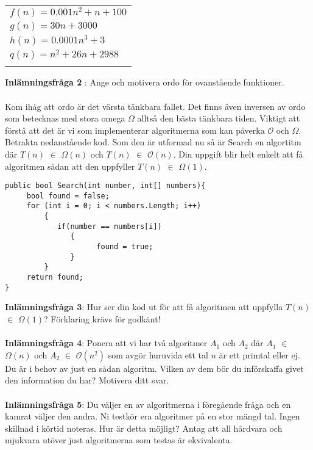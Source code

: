 \documentclass{article}
\begin{document}
 \begin{center}
 \begin{tabular}{ l }
	$f(n) = 0.001n^2 + n + 100$ \\
	$g(n) = 30n + 3000$\\
	$h(n) = 0.0001n^3 + 3$\\
	$q(n) = n^2 + 26n + 2988$\\\\
	\end{tabular}
 \end{center} 
 \textbf{Inlämningsfråga 2} : Ange och motivera ordo för ovanstående funktioner. \\\\
  Kom ihåg att ordo är det värsta tänkbara fallet. Det finns även inversen av ordo som betecknas med stora omega $\Omega$ alltså den bästa tänkbara tiden. Viktigt att förstå att det är vi som implementerar algoritmerna som kan påverka $\mathcal{O}$ och $\Omega$. Betrakta nedanstående kod. Som den är utformad nu så är Search en algortitm där  $T(n)$ $\in$ $\Omega  (n)$ och $T(n)$ $\in$ $\mathcal{O}(n)$. Din uppgift blir helt enkelt att få algoritmen sådan att den uppfyller  $T(n)$ $\in$ $\Omega(1)$.
  \pagebreak
  \begin{lstlisting}
public bool Search(int number, int[] numbers){
     bool found = false;
     for (int i = 0; i < numbers.Length; i++)
         { 
            if(number == numbers[i])
               {
                     found = true;
               }
         }
     return found; 
}
   \end{lstlisting}
  \textbf{Inlämningsfråga 3}: Hur ser din kod ut för att få algoritmen att uppfylla $T(n)$ $\in$ $\Omega(1)$? Förklaring krävs för godkänt! \\\\

      \textbf{Inlämningsfråga 4}: Ponera att vi har två algoritmer $A_1$ och $A_2$ där  $A_1$ $\in$ $\Omega (n)$ och  $A_2$ $\in$ $\mathcal{O}(n^2)$ som avgör huruvida ett tal $n$ är ett primtal eller ej. Du är i behov av just en sådan algoritm. Vilken av dem bör du införskaffa givet den information du har? Motivera ditt svar.\\\\
	      
      \textbf{Inlämningsfråga 5}: Du väljer en av algoritmerna i föregående fråga och en kamrat väljer den andra. Ni
      testkör era algoritmer på en stor mängd tal. Ingen skillnad i körtid noteras. Hur är
      detta möjligt? Antag att all hårdvara och mjukvara utöver just algoritmerna som testas
      är ekvivalenta.
      
\end{document}

